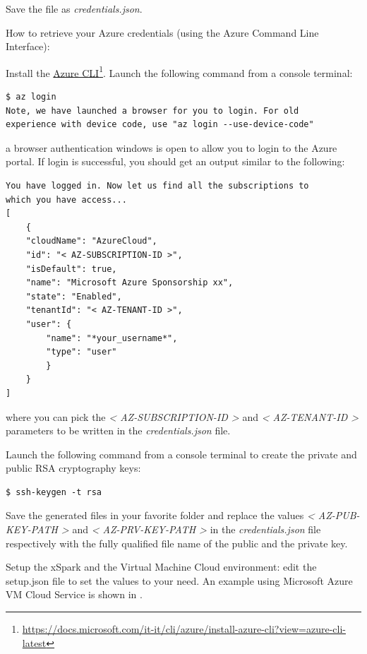 Save the file as \emph{credentials.json}.

How to retrieve your Azure credentials (using the Azure Command Line
Interface):

Install the
\href{https://docs.microsoft.com/it-it/cli/azure/install-azure-cli?view=azure-cli-latest}{Azure CLI}\footnote{\url{https://docs.microsoft.com/it-it/cli/azure/install-azure-cli?view=azure-cli-latest}}. Launch the following command from a console terminal:

\begin{verbatim}
$ az login
Note, we have launched a browser for you to login. For old 
experience with device code, use "az login --use-device-code"
\end{verbatim}

a browser authentication windows is open to allow you to login to the
Azure portal. If login is successful, you should get an output similar
to the following:

\begin{verbatim}
You have logged in. Now let us find all the subscriptions to 
which you have access...
[
	{
	"cloudName": "AzureCloud",
	"id": "< AZ-SUBSCRIPTION-ID >",
	"isDefault": true,
	"name": "Microsoft Azure Sponsorship xx",
	"state": "Enabled",
	"tenantId": "< AZ-TENANT-ID >",
	"user": {
		"name": "*your_username*",
		"type": "user"
		}
	}
]
\end{verbatim}

where you can pick the \emph{\textless{} AZ-SUBSCRIPTION-ID
\textgreater{}} and \emph{\textless{} AZ-TENANT-ID \textgreater{}}
parameters to be written in the \emph{credentials.json} file.

Launch the following command from a console terminal to create the
private and public RSA cryptography keys:

\begin{verbatim}
$ ssh-keygen -t rsa
\end{verbatim}

Save the generated files in your favorite folder and replace the values
\emph{\textless{} AZ-PUB-KEY-PATH \textgreater{}} and \emph{\textless{}
AZ-PRV-KEY-PATH \textgreater{}} in the \emph{credentials.json} file
respectively with the fully qualified file name of the public and the
private key.

Setup the xSpark and the Virtual Machine Cloud environment: edit the 
setup.json file to set the values to your need. An
example using Microsoft Azure VM Cloud Service is shown in .

